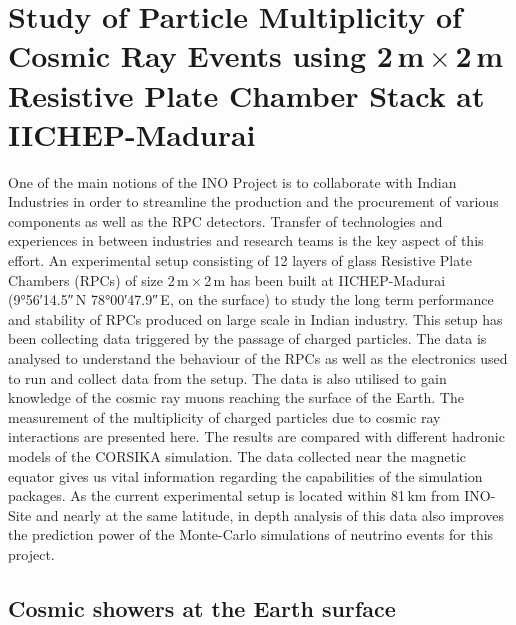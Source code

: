 
\chapter{Study of Particle Multiplicity of Cosmic Ray Events using
  2\,m\,$\times$\,2\,m Resistive Plate Chamber Stack at IICHEP-Madurai}
\label{chapter:multi}

One of the main notions of the INO Project is to collaborate with
Indian Industries in order to streamline the production and the
procurement of various components as well as the RPC detectors.
Transfer of technologies and experiences in between industries and
research teams is the key aspect of this effort.
An experimental setup consisting of 12 layers of glass Resistive Plate
Chambers (RPCs) of size 2\,m\,$\times$\,2\,m has been built at
IICHEP-Madurai (\ang{9;56;14.5}\,N \ang{78;00;47.9}\,E, on the surface)
to study the long term performance and stability of RPCs produced on
large scale in Indian industry. This setup has been collecting data
triggered by the passage of charged particles. The data is analysed
to understand the behaviour of the RPCs as well as the electronics
used to run and collect data from the setup. The data is also utilised
to gain knowledge of the cosmic ray muons reaching the surface of
the Earth. The measurement of the multiplicity of charged particles
due to
cosmic ray interactions are presented here. The results are compared
with different hadronic models of the CORSIKA simulation. The data
collected near the magnetic equator gives us vital information
regarding the capabilities of the simulation packages. As the current
experimental setup is located within 81\,km from INO-Site and
  nearly at the same latitude, in depth
analysis of this data also improves the prediction power of
the Monte-Carlo simulations of neutrino events for this project.

\section{Cosmic showers at the Earth surface}

